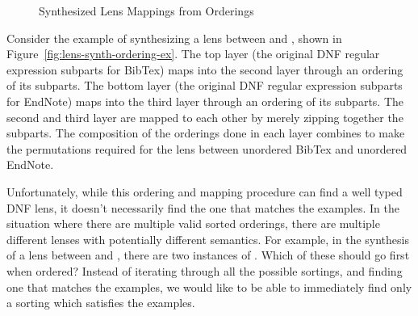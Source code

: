 \documentclass[numbers,10pt,preprint\ifanon ,nocopyrightspace\fi]{sigplanconf}
\begin{document}
\begin{figure}
  \caption{Synthesized Lens Mappings from Orderings}
\end{figure}

Consider the example of synthesizing a lens between  and
, shown in Figure~\ref{fig:lens-synth-ordering-ex}.
The top layer (the original DNF regular expression subparts for BibTex) maps
into the second layer through an ordering of its subparts.
The bottom layer (the original DNF regular expression subparts for EndNote) maps
into the third layer through an ordering of its subparts.
The second and third layer are mapped to each other by merely zipping together
the subparts.
The composition of the orderings done in each layer combines to make
the permutations required for the lens between unordered BibTex and unordered
EndNote.

Unfortunately, while this ordering and mapping procedure can find a well typed
DNF lens, it doesn't
necessarily find the one that matches the examples.  In the situation where
there are multiple valid sorted orderings, there are multiple different lenses
with potentially different semantics.  For example, in the
synthesis of a lens between  and , there are two
instances of .  Which of these should go first when ordered?  Instead
of iterating through all the possible sortings, and finding one that matches
the examples, we would like to
be able to immediately find only a sorting which satisfies the examples.
\end{document}
